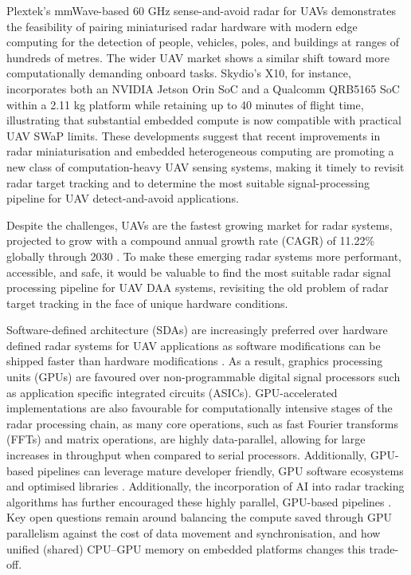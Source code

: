 Plextek’s mmWave-based 60 GHz sense-and-avoid radar for UAVs demonstrates the feasibility of pairing miniaturised radar hardware with modern edge computing for the detection of people, vehicles, poles, and buildings at ranges of hundreds of metres. The wider UAV market shows a similar shift toward more computationally demanding onboard tasks. Skydio’s X10, for instance, incorporates both an NVIDIA Jetson Orin SoC and a Qualcomm QRB5165 SoC within a 2.11 kg platform while retaining up to 40 minutes of flight time, illustrating that substantial embedded compute is now compatible with practical UAV SWaP limits. These developments suggest that recent improvements in radar miniaturisation and embedded heterogeneous computing are promoting a new class of computation-heavy UAV sensing systems, making it timely to revisit radar target tracking and to determine the most suitable signal-processing pipeline for UAV detect-and-avoid applications. 

Despite the challenges, UAVs are the fastest growing market for radar systems, projected to grow with a compound annual growth rate (CAGR) of 11.22\% globally through 2030 \cite{mordor_airborne_radars_market_2025}. To make these emerging radar systems more performant, accessible, and safe, it would be valuable to find the most suitable radar signal processing pipeline for UAV DAA systems, revisiting the old problem of radar target tracking in the face of unique hardware conditions.

Software-defined architecture (SDAs) are increasingly preferred over hardware defined radar systems for UAV applications as software modifications can be shipped faster than hardware modifications \cite{mordor_airborne_radars_market_2025}. As a result, graphics processing units (GPUs) are favoured over non-programmable digital signal processors such as application specific integrated circuits (ASICs). GPU-accelerated implementations are also favourable for computationally intensive stages of the radar processing chain, as many core operations, such as fast Fourier transforms (FFTs) and matrix operations, are highly data-parallel, allowing for large increases in throughput when compared to serial processors. Additionally, GPU-based pipelines can leverage mature developer friendly, GPU software ecosystems and optimised libraries \cite{zaknoun2024_gpu_radar}. Additionally, the incorporation of AI into radar tracking algorithms has further encouraged these highly parallel, GPU-based pipelines \cite{electronics13214251}. Key open questions remain around balancing the compute saved through GPU parallelism against the cost of data movement and synchronisation, and how unified (shared) CPU--GPU memory on embedded platforms changes this trade-off. 

